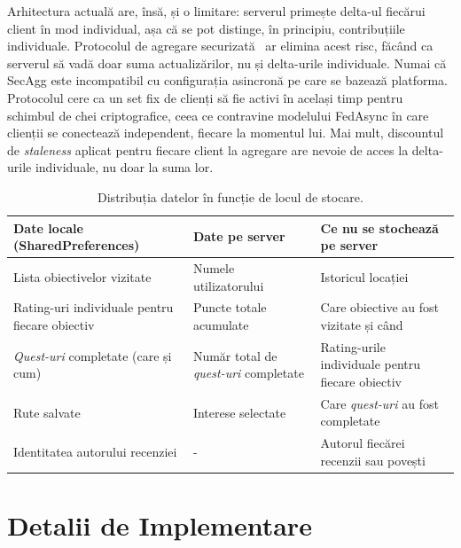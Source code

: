 \documentclass[12pt,a4paper]{report}
\begin{document}
Arhitectura actuală are, însă, și o limitare: serverul primește delta-ul fiecărui client în mod individual, așa că se pot distinge, în principiu, contribuțiile individuale. Protocolul de agregare securizată~\cite{bonawitz2017secagg} ar elimina acest risc, făcând ca serverul să vadă doar suma actualizărilor, nu și delta-urile individuale. Numai că SecAgg este incompatibil cu configurația asincronă pe care se bazează platforma. Protocolul cere ca un set fix de clienți să fie activi în același timp pentru schimbul de chei criptografice, ceea ce contravine modelului FedAsync în care clienții se conectează independent, fiecare la momentul lui. Mai mult, discountul de \textit{staleness} aplicat pentru fiecare client la agregare are nevoie de acces la delta-urile individuale, nu doar la suma lor.

\clearpage
\begin{table}[h]
\centering
\footnotesize
\caption{Distribuția datelor în funcție de locul de stocare.}
\label{tab:privacy}
\begin{tabular}{|p{4cm}|p{4cm}|p{4.5cm}|}
\hline
\textbf{Date locale (SharedPreferences)} & \textbf{Date pe server} & \textbf{Ce nu se stochează pe server} \\
\hline
Lista obiectivelor vizitate & Numele utilizatorului  & Istoricul locației \\
\hline
Rating-uri individuale pentru fiecare obiectiv & Puncte totale acumulate & Care obiective au fost vizitate și când \\
\hline
\textit{Quest-uri} completate (care și cum) & Număr total de \textit{quest-uri} completate & Rating-urile individuale pentru fiecare obiectiv \\
\hline
Rute salvate & Interese selectate & Care \textit{quest-uri} au fost completate \\
\hline
Identitatea autorului recenziei & - & Autorul fiecărei recenzii sau povești \\
\hline
\end{tabular}
\end{table}

\chapter{Detalii de Implementare}
\end{document}
